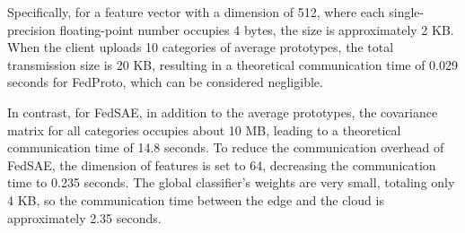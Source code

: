 \documentclass[journal]{IEEEtran}
\begin{document}
Specifically, for a feature vector with a dimension of 512, where each single-precision floating-point number occupies 4 bytes, the size is approximately 2 KB. When the client uploads 10 categories of average prototypes, the total transmission size is 20 KB, resulting in a theoretical communication time of 0.029 seconds for FedProto, which can be considered negligible. 

In contrast, for FedSAE, in addition to the average prototypes, the covariance matrix for all categories occupies about 10 MB, leading to a theoretical communication time of 14.8 seconds. To reduce the communication overhead of FedSAE, the dimension of features is set to 64, decreasing the communication time to 0.235 seconds. The global classifier's weights are very small, totaling only 4 KB, so the communication time between the edge and the cloud is approximately 2.35 seconds.
\end{document}
